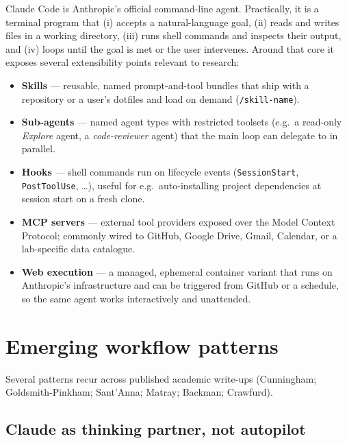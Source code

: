 \documentclass[11pt,a4paper]{article}
\begin{document}
Claude Code is Anthropic's official command-line agent. Practically,
it is a terminal program that (i) accepts a natural-language goal,
(ii) reads and writes files in a working directory, (iii) runs shell
commands and inspects their output, and (iv) loops until the goal is
met or the user intervenes. Around that core it exposes several
extensibility points relevant to research:

\begin{itemize}[leftmargin=1.2em]
  \item \textbf{Skills} --- reusable, named prompt-and-tool bundles
        that ship with a repository or a user's dotfiles and load
        on demand (\texttt{/skill-name}).
  \item \textbf{Sub-agents} --- named agent types with restricted
        toolsets (e.g.\ a read-only \emph{Explore} agent, a
        \emph{code-reviewer} agent) that the main loop can delegate
        to in parallel.
  \item \textbf{Hooks} --- shell commands run on lifecycle events
        (\texttt{SessionStart}, \texttt{PostToolUse}, \ldots),
        useful for e.g.\ auto-installing project dependencies at
        session start on a fresh clone.
  \item \textbf{MCP servers} --- external tool providers exposed
        over the Model Context Protocol; commonly wired to GitHub,
        Google Drive, Gmail, Calendar, or a lab-specific data
        catalogue.
  \item \textbf{Web execution} --- a managed, ephemeral container
        variant that runs on Anthropic's infrastructure and can be
        triggered from GitHub or a schedule, so the same agent
        works interactively and unattended.
\end{itemize}

\section{Emerging workflow patterns}

Several patterns recur across published academic write-ups
(Cunningham; Goldsmith-Pinkham; Sant'Anna; Matray; Backman; Crawfurd).

\subsection{Claude as thinking partner, not autopilot}
\end{document}
